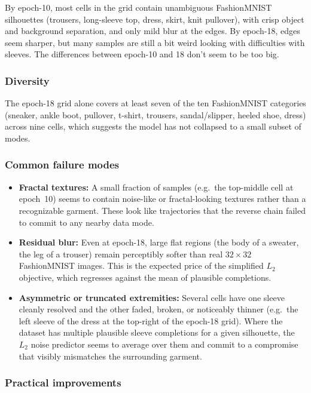 \documentclass{article}
\begin{document}
By epoch-10, most cells in the grid contain unambiguous FashionMNIST
silhouettes (trousers, long-sleeve top, dress, skirt, knit pullover), with
crisp object and background separation, and only mild blur at the edges. By
epoch-18, edges seem sharper, but many samples are still a bit weird looking with difficulties with sleeves. The differences between epoch-10 and 18 don't seem to be too big.

\subsubsection*{Diversity}

The epoch-18 grid alone covers at least seven of the ten FashionMNIST
categories (sneaker, ankle boot, pullover, t-shirt, trousers, sandal/slipper,
heeled shoe, dress) across nine cells, which suggests the model has not
collapsed to a small subset of modes.

\subsubsection*{Common failure modes}

\begin{itemize}
  \item \textbf{Fractal textures:} A small fraction
    of samples (e.g.\ the top-middle cell at epoch~10) seems to contain noise-like or fractal-looking textures rather than a
    recognizable garment. These look like trajectories that the reverse
    chain failed to commit to any nearby data mode.
  \item \textbf{Residual blur:} Even at epoch-18, large flat regions (the
    body of a sweater, the leg of a trouser) remain perceptibly softer than
    real $32\times 32$ FashionMNIST images. This is the expected price of
    the simplified $L_2$ objective, which regresses against the mean of
    plausible completions.
  \item \textbf{Asymmetric or truncated extremities:} Several cells have
    one sleeve cleanly resolved and the other faded,
    broken, or noticeably thinner (e.g.\ the left sleeve of the
    dress at the top-right of the epoch-18 grid). Where the dataset has
    multiple plausible sleeve completions for a given silhouette,
    the $L_2$ noise predictor seems to average over them and commit to a
    compromise that visibly mismatches the surrounding garment.
\end{itemize}

\subsubsection*{Practical improvements}
\end{document}
